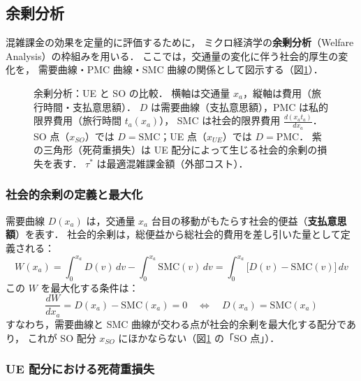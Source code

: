 \subsection{余剰分析}
\label{subsec:surplus-analysis}

混雑課金の効果を定量的に評価するために，
ミクロ経済学の\textbf{余剰分析}（Welfare Analysis）の枠組みを用いる\cite{土木学会1998}．
ここでは，交通量の変化に伴う社会的厚生の変化を，
需要曲線・PMC 曲線・SMC 曲線の関係として図示する（図\ref{fig:surplus-analysis}）．

\begin{figure}[hbtp]
  \centering
  
  \caption{余剰分析：UE と SO の比較．
           横軸は交通量 $x_a$，縦軸は費用（旅行時間・支払意思額）．
           $D$ は需要曲線（支払意思額），PMC は私的限界費用（旅行時間 $t_a(x_a)$），
           SMC は社会的限界費用 $\frac{d(x_a t_a)}{dx_a}$．
           SO 点（$x_{SO}$）では $D = \text{SMC}$；UE 点（$x_{UE}$）では $D = \text{PMC}$．
           紫の三角形（死荷重損失）は UE 配分によって生じる社会的余剰の損失を表す．
           $\tau^*$ は最適混雑課金額（外部コスト）．}
  \label{fig:surplus-analysis}
\end{figure}

\subsubsection*{社会的余剰の定義と最大化}

需要曲線 $D(x_a)$ は，交通量 $x_a$ 台目の移動がもたらす社会的便益（\textbf{支払意思額}）を表す．
社会的余剰は，総便益から総社会的費用を差し引いた量として定義される：
\begin{equation}
  W(x_a)
  = \int_0^{x_a} D(v)\,dv
    - \int_0^{x_a} \text{SMC}(v)\,dv
  = \int_0^{x_a} \bigl[D(v) - \text{SMC}(v)\bigr]\,dv
  \label{eq:social-welfare}
\end{equation}
この $W$ を最大化する条件は：
\begin{equation}
  \frac{d W}{d x_a} = D(x_a) - \text{SMC}(x_a) = 0
  \quad \Longleftrightarrow \quad
  D(x_a) = \text{SMC}(x_a)
  \label{eq:so-condition}
\end{equation}
すなわち，需要曲線と SMC 曲線が交わる点が社会的余剰を最大化する配分であり，
これが SO 配分 $x_{SO}$ にほかならない（図\ref{fig:surplus-analysis} の「SO 点」）．

\subsubsection*{UE 配分における死荷重損失}


